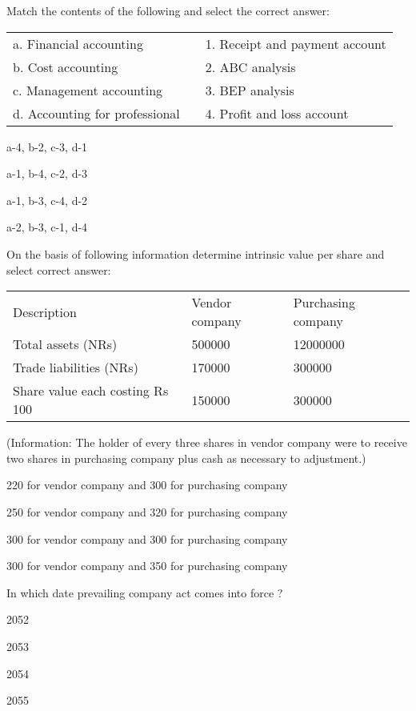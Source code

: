 \begin{questions}
\question Match the contents of the following and select the correct answer:
  \begin{table}[h]
  \centering
  \begin{tabular}{lll}
    a. Financial accounting & & 1. Receipt and payment account \\[2mm]
    b. Cost accounting & & 2. ABC analysis \\
    c. Management accounting & & 3. BEP analysis \\
    d. Accounting for professional & & 4. Profit and loss account \\
  \end{tabular}
  \end{table}
  \begin{items}
  \item a-4, b-2, c-3, d-1
  \item a-1, b-4, c-2, d-3
  \item a-1, b-3, c-4, d-2
  \item a-2, b-3, c-1, d-4
  \end{items}

\question On the basis of following information determine intrinsic value per share and select correct answer:
  \begin{table}[h]
  \centering
  \begin{tabular}{lll}
    Description & Vendor company & Purchasing company \\[2mm]
    Total assets (NRs) & 500000 & 12000000 \\
    Trade liabilities (NRs) & 170000 & 300000 \\
    Share value each costing Rs 100 & 150000 & 300000 \\
  \end{tabular}
  \end{table}
  (Information: The holder of every three shares in vendor company were to receive two shares in purchasing company plus cash as necessary to adjustment.)
  \begin{items}
  \item 220 for vendor company and 300 for purchasing company
  \item 250 for vendor company and 320 for purchasing company
  \item 300 for vendor company and 300 for purchasing company
  \item 300 for vendor company and 350 for purchasing company
  \end{items}

\question In which date prevailing company act comes into force ?
  \begin{items}
  \item 2052
  \item 2053
  \item 2054
  \item 2055
  \end{items}


\end{questions}
